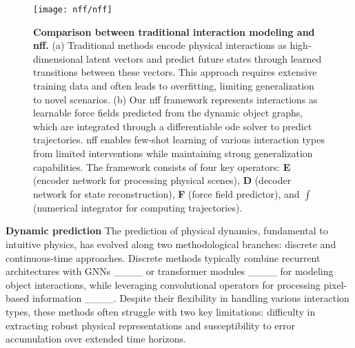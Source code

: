 \begin{figure*}[t!]
    \centering
    \texttt{[image: nff/nff]}
    \caption{\textbf{Comparison between traditional interaction modeling and \ac{nff}.} (a) Traditional methods encode physical interactions as high-dimensional latent vectors and predict future states through learned transitions between these vectors. This approach requires extensive training data and often leads to overfitting, limiting generalization to novel scenarios. (b) Our \ac{nff} framework represents interactions as learnable force fields predicted from the dynamic object graphs, which are integrated through a differentiable \ac{ode} solver to predict trajectories. \ac{nff} enables few-shot learning of various interaction types from limited interventions while maintaining strong generalization capabilities. The framework consists of four key operators: \textbf{E} (encoder network for processing physical scenes), \textbf{D} (decoder network for state reconstruction), \textbf{F} (force field predictor), and \textbf{$\int$} (numerical integrator for computing trajectories).}
    \label{fig:overview}
\end{figure*}

\textbf{Dynamic prediction\quad{}}
The prediction of physical dynamics, fundamental to intuitive physics, has evolved along two methodological branches: discrete and continuous-time approaches. Discrete methods typically combine recurrent architectures with GNNs ____ or transformer modules ____ for modeling object interactions, while leveraging convolutional operators for processing pixel-based information ____. Despite their flexibility in handling various interaction types, these methods often struggle with two key limitations: difficulty in extracting robust physical representations and susceptibility to error accumulation over extended time horizons.

